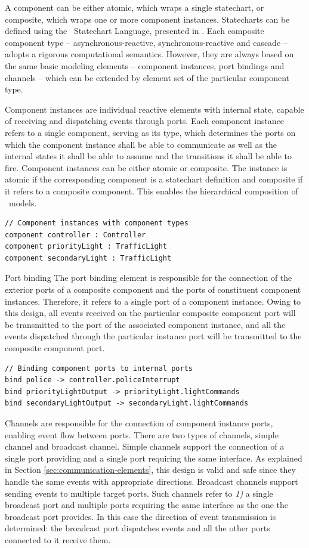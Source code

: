 A component can be either atomic, which wraps a single statechart, or composite, which wraps one or more component instances. Statecharts can be defined using the \gamma\ Statechart Language, presented in \cite{graics-bence-bsc}. Each composite component type -- asynchronous-reactive, synchronous-reactive and cascade -- adopts a rigorous computational semantics. However, they are always based on the same basic modeling elements -- component instances, port bindings and channels -- which can be extended by element set of the particular component type.

Component instances are individual reactive elements with internal state, capable of receiving
and dispatching events through ports. Each component instance refers to a single
component, serving as its type, which determines the ports on which
the component instance shall be able to communicate as well as the internal states it shall
be able to assume and the transitions it shall be able to fire. Component instances can
be either atomic or composite. The instance is atomic if the corresponding component is a
statechart definition and composite if it refers to a composite component. This enables the
hierarchical composition of \gamma\ models.

\begin{lstlisting}
// Component instances with component types
component controller : Controller
component priorityLight : TrafficLight
component secondaryLight : TrafficLight
\end{lstlisting}

Port binding The port binding element is responsible for the connection of the exterior
ports of a composite component and the ports of constituent component instances. Therefore,
it refers to a single port of a component instance. Owing to this design, all events received on the particular composite component port will be transmitted to the port of the associated
component instance, and all the events dispatched through the particular instance port will
be transmitted to the composite component port.

\begin{lstlisting}
// Binding component ports to internal ports
bind police -> controller.policeInterrupt
bind priorityLightOutput -> priorityLight.lightCommands
bind secondaryLightOutput -> secondaryLight.lightCommands
\end{lstlisting}

Channels are responsible for the connection of component instance ports, enabling event flow between ports. There are two types of channels, simple channel and broadcast channel. Simple channels support the connection of a single port providing and a single port
requiring the same interface. As explained in Section \ref{sec:communication-elements}, this design is valid and safe
since they handle the same events with appropriate directions. Broadcast channels support sending events to multiple target ports. Such channels refer
to \textit{1)} a single broadcast port and  multiple ports requiring the same interface as the
one the broadcast port provides. In this case the direction of event transmission is
determined: the broadcast port dispatches events and all the other ports connected to
it receive them.


